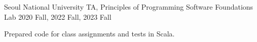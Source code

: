 

\begin{cventries}

  \cventry
  {Seoul National University} %
  {TA, Principles of Programming} %
  {Software Foundations Lab} %
  {2020 Fall, 2022 Fall, 2023 Fall} %
  {
    \begin{cvitems} %
      \item {Prepared code for class assignments and tests in Scala.}
    \end{cvitems}
  }

\end{cventries}
